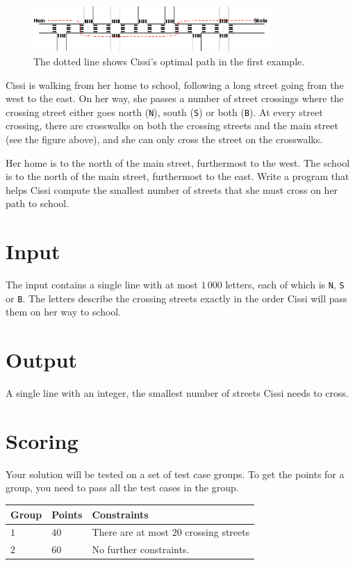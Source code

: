 
\begin{figure}[!h]
\begin{center}
\includegraphics[width=0.8\textwidth]{skolvag.png}
\end{center}
\caption{The dotted line shows Cissi's optimal path in the first example.}
\end{figure}

\noindent
Cissi is walking from her home to school, following a long street going from the west to the east.
On her way, she passes a number of street crossings where the crossing street either goes north (\texttt{N}), south (\texttt{S}) or both (\texttt{B}).
At every street crossing, there are crosswalks on both the crossing streets and the main street (see the figure above), and she can only cross the street on the crosswalks.

Her home is to the north of the main street, furthermost to the west.
The school is to the north of the main street, furthermost to the east.
Write a program that helps Cissi compute the smallest number of streets that she must cross on her path to school.

\section*{Input}
The input contains a single line with at most $1\,000$ letters, each of which is {\tt N}, {\tt S} or {\tt B}.
The letters describe the crossing streets exactly in the order Cissi will pass them on her way to school.

\section*{Output}
A single line with an integer, the smallest number of streets Cissi needs to cross.

\section*{Scoring}
Your solution will be tested on a set of test case groups.
To get the points for a group, you need to pass all the test cases in the group.

\noindent
\begin{tabular}{| l | l | p{10cm} |}
\hline
Group & Points & Constraints \\ \hline
  $1$    & $40$        & There are at most $20$ crossing streets \\ \hline 
  $2$    & $60$        & No further constraints. \\ \hline 
\end{tabular}

